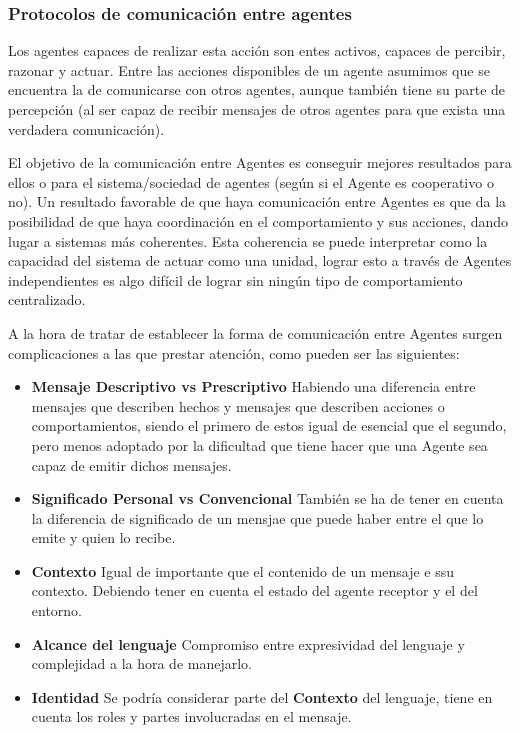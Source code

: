 \subsubsection{Protocolos de comunicación entre agentes}

Los agentes capaces de realizar esta acción son entes activos, capaces de percibir, razonar y actuar. Entre las acciones disponibles de un agente asumimos que se encuentra la de comunicarse con otros agentes, aunque también tiene su parte de percepción (al ser capaz de recibir mensajes de otros agentes para que exista una verdadera comunicación).

El objetivo de la comunicación entre Agentes es conseguir mejores resultados para ellos o para el sistema/sociedad de agentes (según si el Agente es cooperativo o no). Un resultado favorable de que haya comunicación entre Agentes es que da la posibilidad de que haya coordinación en el comportamiento y sus acciones, dando lugar a sistemas más coherentes. Esta coherencia se puede interpretar como la capacidad del sistema de actuar como una unidad, lograr esto a través de Agentes independientes es algo difícil de lograr sin ningún tipo de comportamiento centralizado. 

A la hora de tratar de establecer la forma de comunicación entre Agentes surgen complicaciones a las que prestar atención, como pueden ser las siguientes:

\begin{itemize}
	\item\textbf{Mensaje Descriptivo vs Prescriptivo} Habiendo una diferencia entre mensajes que describen hechos y mensajes que describen acciones o comportamientos, siendo el primero de estos igual de esencial que el segundo, pero menos adoptado por la dificultad que tiene hacer que una Agente sea capaz de emitir dichos mensajes.
	\item\textbf{Significado Personal vs Convencional} También se ha de tener en cuenta la diferencia de significado de un mensjae que puede haber entre el que lo emite y quien lo recibe.
	\item\textbf{Contexto} Igual de importante que el contenido de un mensaje e ssu contexto. Debiendo tener en cuenta el estado del agente receptor y el del entorno.
	\item\textbf{Alcance del lenguaje} Compromiso entre expresividad del lenguaje y complejidad a la hora de manejarlo.
	\item\textbf{Identidad} Se podría considerar parte del \textbf{Contexto} del lenguaje, tiene en cuenta los roles y partes involucradas en el mensaje.
\end{itemize}

